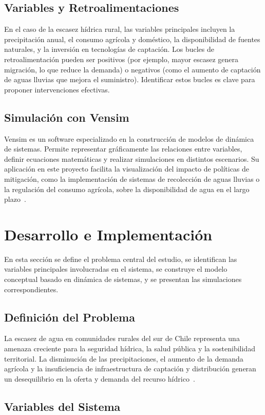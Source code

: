 \documentclass[10pt]{article}
\begin{document}
\subsection{Variables y Retroalimentaciones}
En el caso de la escasez hídrica rural, las variables principales incluyen la precipitación anual, el consumo agrícola y doméstico, la disponibilidad de fuentes naturales, y la inversión en tecnologías de captación. Los bucles de retroalimentación pueden ser positivos (por ejemplo, mayor escasez genera migración, lo que reduce la demanda) o negativos (como el aumento de captación de aguas lluvias que mejora el suministro). Identificar estos bucles es clave para proponer intervenciones efectivas.
\subsection{Simulación con Vensim}
Vensim es un software especializado en la construcción de modelos de dinámica de sistemas. Permite representar gráficamente las relaciones entre variables, definir ecuaciones matemáticas y realizar simulaciones en distintos escenarios. Su aplicación en este proyecto facilita la visualización del impacto de políticas de mitigación, como la implementación de sistemas de recolección de aguas lluvias o la regulación del consumo agrícola, sobre la disponibilidad de agua en el largo plazo~\parencite{vensimdocs}.
\section{Desarrollo e Implementación}
En esta sección se define el problema central del estudio, se identifican las variables principales involucradas en el sistema, se construye el modelo conceptual basado en dinámica de sistemas, y se presentan las simulaciones correspondientes.
\subsection{Definición del Problema}
La escasez de agua en comunidades rurales del sur de Chile representa una amenaza creciente para la seguridad hídrica, la salud pública y la sostenibilidad territorial. La disminución de las precipitaciones, el aumento de la demanda agrícola y la insuficiencia de infraestructura de captación y distribución generan un desequilibrio en la oferta y demanda del recurso hídrico~\parencite{cr2,mop2019}.

\subsection{Variables del Sistema}
\end{document}
